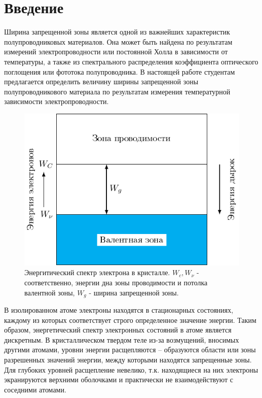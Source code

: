 

\renewcommand{\phi}{\varphi}



\def\labauthors{Карусевич А.А., Понур К.А.}
\def\labgroup{430}
\def\labnumber{1}
\def\labtheme{Измерение ширины запрещенной зоны}
\def\department{}



\newpage
\section*{Введение}
Ширина запрещенной зоны является одной из важнейших характеристик полупроводниковых материалов. Она может быть найдена
по результатам измерений электропроводности или постоянной Холла в зависимости от температуры, а также из спектрального 
распределения коэффициента оптического поглощения или фототока полупроводника. В настоящей работе студентам предлагается
определить величину ширины запрещенной зоны полупроводникового материала по результатам измерения температурной зависимости 
электропроводности. 
\begin{figure}
	\includegraphics[width = \linewidth]{img/cond.pdf}
	\caption{Энергитический спектр электрона в кристалле. $W_c,W_{\nu}$ - соответственно, энергии дна зоны проводимости и потолка валентной зоны, $W_g$ - ширина запрещенной зоны.}
	\label{fig:cond}
\end{figure}
В изолированном атоме электроны находятся в стационарных состояниях, каждому из которых соответствует строго
определенное значение энергии. Таким образом, энергетический спектр электронных состояний в атоме является дискретным. В
кристаллическом твердом теле из-за возмущений, вносимых другими атомами, уровни энергии расщепляются – образуются
области или зоны разрешенных значений энергии, между которыми находятся запрещенные зоны. Для глубоких уровней
расщепление невелико, т.к. находящиеся на них электроны экранируются верхними оболочками и практически не
взаимодействуют с соседними атомами. 

